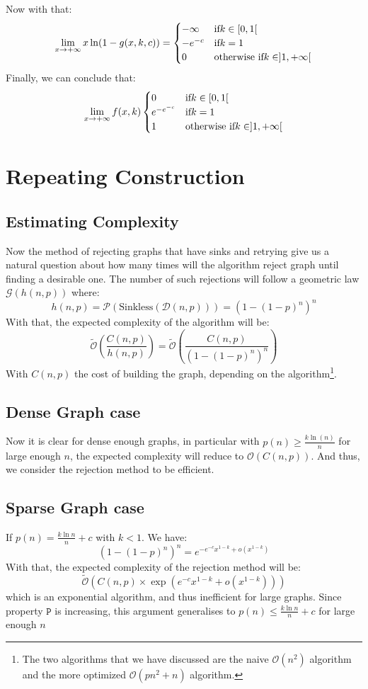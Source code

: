 Now with that:
$$
\lim_{x\rightarrow +\infty} x\ln (1-g(x,k,c))=\begin{cases}
	-\infty  & \text{if} \space k\in[0,1[ \\
	-e^{-c} & \text{if}\space k=1  \\
	0 & \text{otherwise if}\space k\in ]1,+\infty[ 
\end{cases}
$$
Finally, we can conclude that:
$$
\lim_{x\rightarrow +\infty} f(x,k)\begin{cases}
	0  & \text{if} \space k\in[0,1[ \\
	e^{-e^{-c}} & \text{if}\space k=1  \\
	1 & \text{otherwise if}\space k\in ]1,+\infty[ 
\end{cases}
$$
\section{Repeating Construction}
\subsection{Estimating Complexity}
Now the method of rejecting graphs that have sinks and retrying give us a natural question about how many times will the algorithm reject graph until finding a desirable one.\newline
The number of such rejections will follow a geometric law $\mathcal{G}(h(n,p))$ where: $$
h(n,p)=\mathscr{P}\left(\text{Sinkless}(\mathcal{D}(n,p))\right)=(1-(1-p)^n)^n
$$
\newline With that, the expected complexity of the algorithm will be:
$$
\tilde{\mathcal{O}}\left(\frac{C(n,p)}{h(n,p)}\right)=\tilde{\mathcal{O}}\left(\frac{C(n,p)}{(1-(1-p)^n)^n}\right)
$$
With $C(n,p)$ the cost of building the graph, depending on the algorithm\footnote{The two algorithms that we have discussed are the naive $\mathcal{O}(n^2)$ algorithm and the more optimized $\mathcal{O}(pn^2+n)$ algorithm.}.
\subsection{Dense Graph case}
Now it is clear for dense enough graphs, in particular with $p(n) \ge \frac{k\ln (n)}{n}$ for large enough $n$, the expected complexity will reduce to $\mathcal{O}(C(n,p))$. And thus, we consider the rejection method to be efficient.
\subsection{Sparse Graph case}
If $p(n)=\frac{k\ln n}{n}+c$ with $k<1.$ We have:
$$
(1-(1-p)^n)^n=e^{-e^{-c}x^{1-k}+o(x^{1-k})}
$$
With that, the expected complexity of the rejection method will be:
$$
\tilde{\mathcal{O}}\left(C(n,p)\times \exp\left(e^{-c}x^{1-k}+o(x^{1-k})\right)\right)
$$
which is an exponential algorithm, and thus inefficient for large graphs.
Since property $\mathtt{P}$ is increasing, this argument generalises to $p(n) \le \frac{k\ln n}{n}+c$ for large enough $n$
